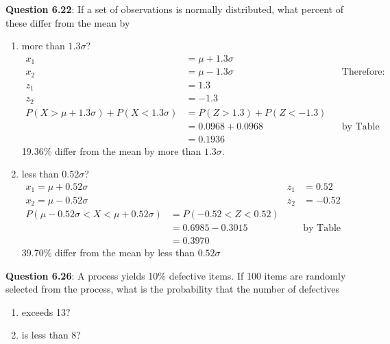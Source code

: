\documentclass{article}
\begin{document}
    \noindent\textbf{Question 6.22}: If a set of observations is normally distributed,
    what percent of these differ from the mean by
        \begin{enumerate}[label = (\alph*) ]
            \item more than $1.3\sigma$?
                \begin{align*}
                    x_1 &= \mu + 1.3\sigma\\
                    x_2 &= \mu - 1.3\sigma &&\text{Therefore:}\\
                    z_1 &= 1.3\\
                    z_2 &= -1.3\\
                    P(X>\mu + 1.3\sigma)+P(X < 1.3\sigma) &= P(Z>1.3) + P(Z<-1.3)\\
                                                          &= 0.0968 + 0.0968 &&\text{by Table A.3}\\
                                                          &= 0.1936
                \end{align*}
                19.36\% differ from the mean by more than $1.3\sigma$.
            \item less than $0.52\sigma$?
                \begin{align*}
                    x_1 = \mu+0.52\sigma && z_1 &= 0.52\\
                    x_2 = \mu-0.52\sigma && z_2 &= -0.52\\
                    P(\mu - 0.52\sigma < X < \mu + 0.52\sigma) &= P(-0.52 < Z < 0.52) \\
                                                               &= 0.6985 - 0.3015 &&\text{by Table A.3}\\
                                                               &= 0.3970
                \end{align*}
                39.70\% differ from the mean by less than $0.52\sigma$
        \end{enumerate}

    \noindent\textbf{Question 6.26}: A process yields 10\% defective items. If 100
    items are randomly selected from the process, what is the probability 
    that the number of defectives
        \begin{enumerate}[label = (\alph*) ]
            \item exceeds 13?
            \item is less than 8?
        \end{enumerate}
\end{document}
